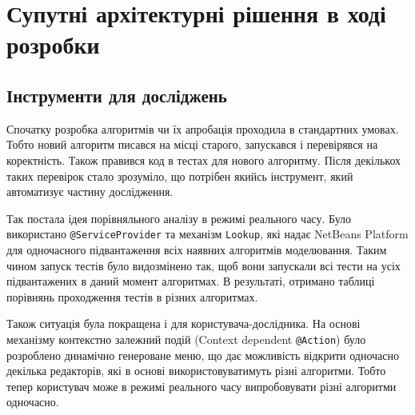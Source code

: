 \documentclass[12pt,a4paper]{article}
\begin{document}


\clearpage

\section{Супутні архітектурні рішення в ході розробки}

\subsection{Інструменти для досліджень}

Спочатку розробка алгоритмів чи їх апробація проходила в стандартних умовах. Тобто новий алгоритм писався на місці старого, запускався і перевірявся на коректність. Також правився код в тестах для нового алгоритму. Після декількох таких перевірок стало зрозуміло, що потрібен якийсь інструмент, який автоматизує частину дослідження.

Так постала ідея порівняльного аналізу в режимі реального часу. Було використано \lstinline$@ServiceProvider$ та механізм \lstinline$Lookup$, які надає NetBeans Platform для одночасного підвантаження всіх наявних алгоритмів моделювання. Таким чином запуск тестів було видозмінено так, щоб вони запускали всі тести на усіх підвантажених в даний момент алгоритмах. В результаті, отримано таблиці порівнянь проходження тестів в різних алгоритмах.

Також ситуація була покращена і для користувача-дослідника. На основі механізму контекстно залежний подій (Context dependent \lstinline$@Action$) було розроблено динамічно генероване меню, що дає можливість відкрити одночасно декілька редакторів, які в основі використовуватимуть різні алгоритми. Тобто тепер користувач може в режимі реального часу випробовувати різні алгоритми одночасно.

%
%

\clearpage
\end{document}

